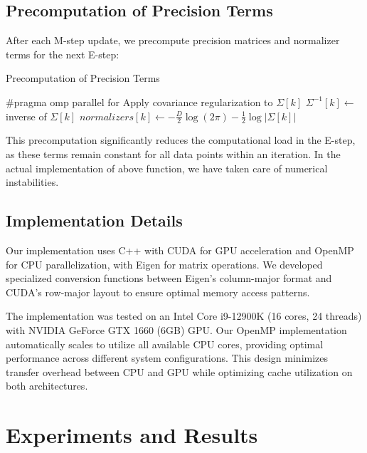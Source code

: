 \documentclass[conference]{IEEEtran}
\begin{document}
\subsection{Precomputation of Precision Terms}

After each M-step update, we precompute precision matrices and normalizer terms for the next E-step:

\begin{algorithm}
\caption{Precomputation of Precision Terms}
\begin{algorithmic}[1]
\STATE \#pragma omp parallel for
    \STATE Apply covariance regularization to $\Sigma[k]$
    \STATE $\Sigma^{-1}[k] \gets$ inverse of $\Sigma[k]$
    \STATE $normalizers[k] \gets -\frac{D}{2}\log(2\pi) - \frac{1}{2}\log|\Sigma[k]|$
\ENDFOR
\end{algorithmic}
\end{algorithm}

This precomputation significantly reduces the computational load in the E-step, as these terms remain constant for all data points within an iteration. In the actual implementation of above function, we have taken care of numerical instabilities.

\subsection{Implementation Details}

Our implementation uses C++ with CUDA for GPU acceleration and OpenMP for CPU parallelization, with Eigen for matrix operations. We developed specialized conversion functions between Eigen's column-major format and CUDA's row-major layout to ensure optimal memory access patterns.

The implementation was tested on an Intel Core i9-12900K (16 cores, 24 threads) with NVIDIA GeForce GTX 1660 (6GB) GPU. Our OpenMP implementation automatically scales to utilize all available CPU cores, providing optimal performance across different system configurations. This design minimizes transfer overhead between CPU and GPU while optimizing cache utilization on both architectures.

\section{Experiments and Results}
\end{document}

